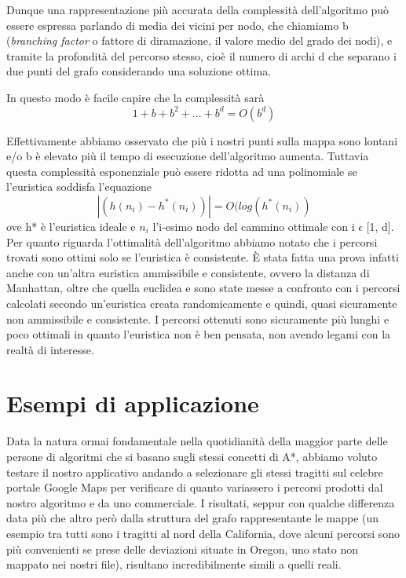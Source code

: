 \documentclass[12pt,a4paper]{report}
\begin{document}
Dunque una rappresentazione più accurata della complessità dell'algoritmo può essere espressa parlando di media dei vicini per nodo, che chiamiamo b (\emph{branching factor} o fattore di diramazione, il valore medio del grado dei nodi), e tramite la profondità del percorso stesso, cioè il numero di archi d che separano i due punti del grafo considerando una soluzione ottima.

In questo modo è facile capire che la complessità sarà \[1+b+b^2+...+b^d = O(b^{d})\]


Effettivamente abbiamo osservato che più i nostri punti sulla mappa sono lontani e/o b è elevato più il tempo di esecuzione dell'algoritmo aumenta.
Tuttavia questa complessità esponenziale può essere ridotta ad una polinomiale se l'euristica soddisfa l'equazione \[|(h(n_i)-h^*(n_i))| = O(log(h^*(n_i))\]
ove h* è l'euristica ideale e \(n_i\) l'i-esimo nodo del cammino ottimale con i \(\epsilon\) [1, d].
\\


Per quanto riguarda l'ottimalità dell'algoritmo abbiamo notato che i percorsi trovati sono ottimi solo se l'euristica è consistente. È stata fatta una prova infatti anche con un'altra euristica ammissibile e consistente, ovvero la distanza di Manhattan, oltre che quella euclidea e sono state messe a confronto con i percorsi calcolati secondo un'euristica creata randomicamente e quindi, quasi sicuramente non ammissibile e consistente.
I percorsi ottenuti sono sicuramente più lunghi e poco ottimali in quanto l'euristica non è ben pensata, non avendo legami con la realtà di interesse. 

\chapter{Esempi di applicazione}

Data la natura ormai fondamentale nella quotidianità della maggior parte delle persone di algoritmi che si basano sugli stessi concetti di A*, abbiamo voluto testare il nostro applicativo andando a selezionare gli stessi tragitti sul celebre portale Google Maps per verificare di quanto variassero i percorsi prodotti dal nostro algoritmo e da uno commerciale. I risultati, seppur con qualche differenza data più che altro però dalla struttura del grafo rappresentante le mappe (un esempio tra tutti sono i tragitti al nord della California, dove alcuni percorsi sono più convenienti se prese delle deviazioni situate in Oregon, uno stato non mappato nei nostri file), risultano incredibilmente simili a quelli reali.
\end{document}
